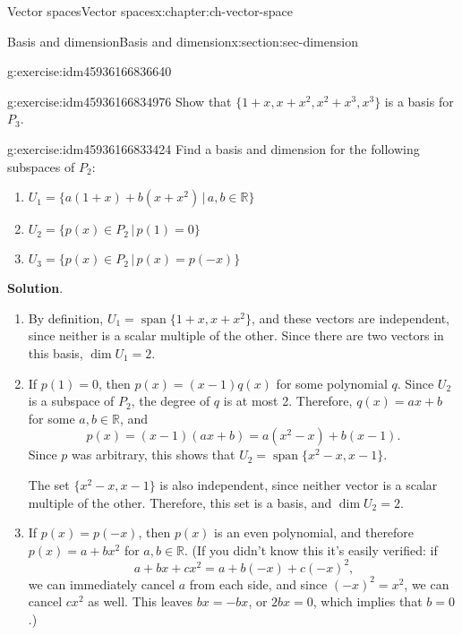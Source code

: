 \documentclass[oneside,10pt,]{book}
\newcommand{\blocktitlefont}{\relax}
\numberwithin{equation}{section}
\newcommand{\spn}{\operatorname{span}}
\newcommand{\R}{\mathbb{R}}
\begin{document}
\begin{chapterptx}{Vector spaces}{}{Vector spaces}{}{}{x:chapter:ch-vector-space}
\begin{sectionptx}{Basis and dimension}{}{Basis and dimension}{}{}{x:section:sec-dimension}
\begin{inlineexercise}{}{g:exercise:idm45936166836640}
\begin{equation*}
\end{equation*}
%
\end{inlineexercise}%
\begin{inlineexercise}{}{g:exercise:idm45936166834976}%
Show that \(\{1+x,x+x^2,x^2+x^3,x^3\}\) is a basis for \(P_3\).%
\end{inlineexercise}%
\begin{inlineexercise}{}{g:exercise:idm45936166833424}%
Find a basis and dimension for the following subspaces of \(P_2\):%
\begin{enumerate}[label=\alph*]
\item{}\(\displaystyle U_1 = \{a(1+x)+b(x+x^2)\,|\, a,b\in\R\}\)%
\item{}\(\displaystyle U_2=\{p(x)\in P_2 \,|\, p(1)=0\}\)%
\item{}\(\displaystyle U_3 = \{p(x)\in P_2 \,|\, p(x)=p(-x)\}\)%
\end{enumerate}
%
\par\smallskip%
\noindent\textbf{\blocktitlefont Solution}.\label{g:solution:idm45936166829312}{}\hypertarget{g:solution:idm45936166829312}{}\quad{}%
\begin{enumerate}[label=\alph*]
\item{}By definition, \(U_1 = \spn \{1+x,x+x^2\}\), and these vectors are independent, since neither is a scalar multiple of the other. Since there are two vectors in this basis, \(\dim U_1 = 2\).%
\item{}If \(p(1)=0\), then \(p(x)=(x-1)q(x)\) for some polynomial \(q\). Since \(U_2\) is a subspace of \(P_2\), the degree of \(q\) is at most 2. Therefore, \(q(x)=ax+b\) for some \(a,b\in\R\), and%
\begin{equation*}
p(x) = (x-1)(ax+b) = a(x^2-x)+b(x-1)\text{.}
\end{equation*}
Since \(p\) was arbitrary, this shows that \(U_2 = \spn\{x^2-x,x-1\}\).%
\par
The set \(\{x^2-x,x-1\}\) is also independent, since neither vector is a scalar multiple of the other. Therefore, this set is a basis, and \(\dim U_2=2\).%
\item{}If \(p(x)=p(-x)\), then \(p(x)\) is an even polynomial, and therefore \(p(x)=a+bx^2\) for \(a,b\in\R\). (If you didn't know this it's easily verified: if%
\begin{equation*}
a+bx+cx^2 = a+b(-x)+c(-x)^2\text{,}
\end{equation*}
we can immediately cancel \(a\) from each side, and since \((-x)^2=x^2\), we can cancel \(cx^2\) as well. This leaves \(bx=-bx\), or \(2bx=0\), which implies that \(b=0\).)%

\end{enumerate}
\end{inlineexercise}
\end{sectionptx}
\end{chapterptx}
\end{document}
